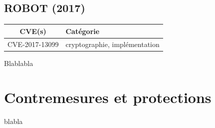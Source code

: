 

\subsection{ROBOT (2017)}

\begin{tabularx}{0.96\textwidth}{|c|X|}
  \hline
  \textbf{CVE(s)} & \textbf{Catégorie} \\
  \hline
  CVE-2017-13099 & cryptographie, implémentation \\
  \hline
\end{tabularx}

\vspace{1em}

Blablabla \cite{robot}



\section{Contremesures et protections}

blabla
